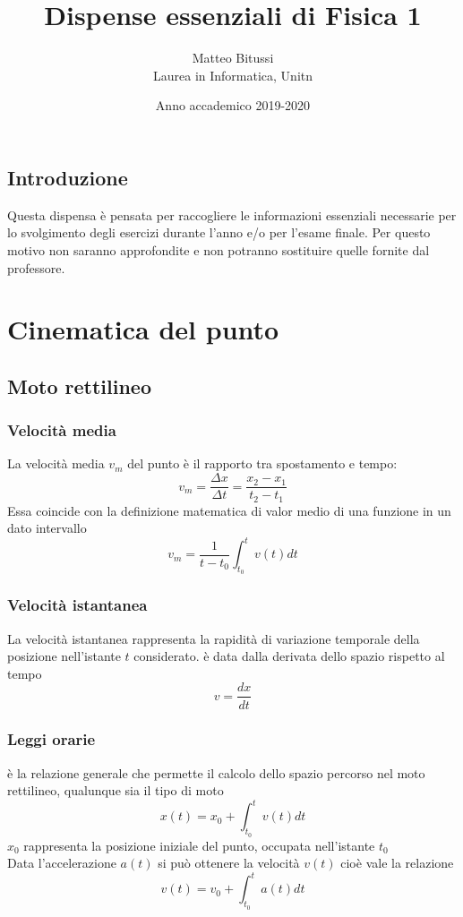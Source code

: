 \documentclass[a4paper]{report}
\title{Dispense essenziali di Fisica 1}
\author{Matteo Bitussi \\ Laurea in Informatica, Unitn}
\date{Anno accademico 2019-2020}
\begin{document}
  \maketitle

  \tableofcontents

  \section*{Introduzione}
  Questa dispensa è pensata per raccogliere le informazioni essenziali necessarie per lo svolgimento degli esercizi durante l'anno e/o per l'esame finale. Per questo motivo non saranno approfondite e non potranno sostituire quelle fornite dal professore.

  \chapter{Cinematica del punto}
  \section{Moto rettilineo}
  \subsection{Velocità media}
  La velocità media $v_m$ del punto è il rapporto tra spostamento e tempo:
  \[ v_m = \frac{\Delta x}{\Delta t} = \frac{x_2 - x_1}{t_2 - t_1} \]
  Essa coincide con la definizione matematica di valor medio di una funzione in un dato intervallo
  \[ v_m = \frac{1}{t-t_0} \int_{t_0}^t v(t) dt \]
  \subsection{Velocità istantanea}
  La velocità istantanea  rappresenta la rapidità di variazione temporale della posizione nell'istante $t$ considerato. è data dalla derivata dello spazio rispetto al tempo
  \[ v = \frac{dx}{dt} \]
  \subsection{Leggi orarie}
  è la relazione generale che permette il calcolo dello spazio percorso nel moto rettilineo, qualunque sia il tipo di moto
  \[ x(t) = x_0 + \int_{t_0}^t v(t) dt \]
  $x_0$ rappresenta la posizione iniziale del punto, occupata nell'istante $t_0$
  \\
    Data l'accelerazione $a(t)$ si può ottenere la velocità $v(t)$ cioè vale la relazione
  \[ v(t) = v_0 + \int_{t_0}^t a(t) dt\]
\end{document}
